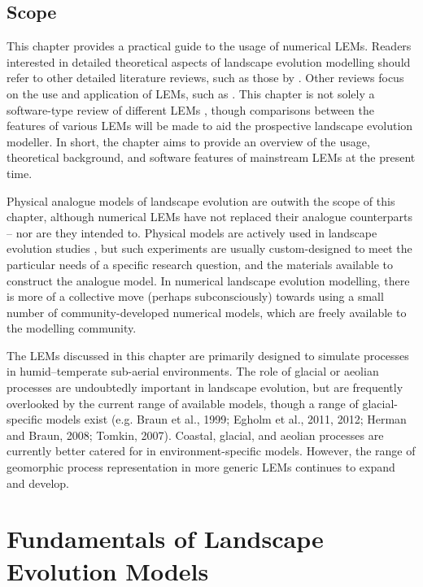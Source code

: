 \subsection[Scope]{Scope}
This chapter provides a practical guide to the usage of numerical LEMs. Readers interested in detailed theoretical aspects of landscape evolution modelling should refer to other detailed literature reviews, such as those by \citet{Pazzaglia2003,martin2004numerical,Willgoose2005,Tucker2010}. Other reviews focus on the use and application of LEMs, such as \citet{willgoose2011,van2011modelling,temme2013quantitative}. This chapter is not solely a software-type review of different LEMs \citep[e.g.][]{Coulthard2001}, though comparisons between the features of various LEMs will be made to aid the prospective landscape evolution modeller. In short, the chapter aims to provide an overview of the usage, theoretical background, and software features of mainstream LEMs at the present time.

Physical analogue models of landscape evolution are outwith the scope of this chapter, although numerical LEMs have not replaced their analogue counterparts – nor are they intended to. Physical models are actively used in landscape evolution studies \citep{hancock2002testing,Bonnet2006,Bonnet2009,Sweeney2015}, but such experiments are usually custom-designed to meet the particular needs of a specific research question, and the materials available to construct the analogue model. In numerical landscape evolution modelling, there is more of a collective move (perhaps subconsciously) towards using a small number of community-developed numerical models, which are freely available to the modelling community.

The LEMs discussed in this chapter are primarily designed to simulate processes in humid–temperate sub-aerial environments. The role of glacial or aeolian processes are undoubtedly important in landscape evolution, but are frequently overlooked by the current range of available models, though a range of glacial-specific models exist (e.g. Braun et al., 1999; Egholm et al., 2011, 2012; Herman and Braun, 2008; Tomkin, 2007). Coastal, glacial, and aeolian processes are currently better catered for in environment-specific models. However, the range of geomorphic process representation in more generic LEMs continues to expand and develop.

\section{Fundamentals of Landscape Evolution Models}

